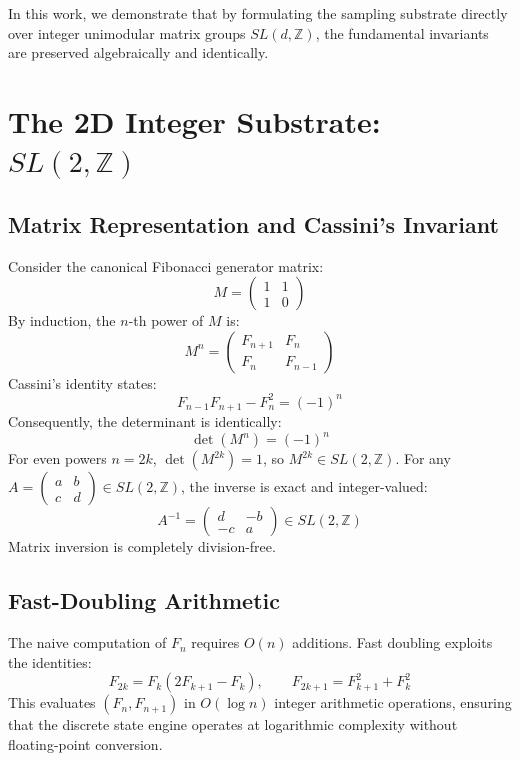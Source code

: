 \documentclass{article}
\theoremstyle{remark}
\begin{document}
In this work, we demonstrate that by formulating the sampling substrate directly over integer unimodular matrix groups $SL(d,\mathbb{Z})$, the fundamental invariants are preserved algebraically and identically.

\section{The 2D Integer Substrate: $SL(2,\mathbb{Z})$}

\subsection{Matrix Representation and Cassini's Invariant}

Consider the canonical Fibonacci generator matrix:
\[
M = \begin{pmatrix} 1 & 1 \\ 1 & 0 \end{pmatrix}
\]
By induction, the $n$-th power of $M$ is:
\[
M^n = \begin{pmatrix} F_{n+1} & F_n \\ F_n & F_{n-1} \end{pmatrix}
\]
Cassini's identity states:
\[
F_{n-1}F_{n+1} - F_n^2 = (-1)^n
\]
Consequently, the determinant is identically:
\[
\det(M^n) = (-1)^n
\]
For even powers $n = 2k$, $\det(M^{2k}) = 1$, so $M^{2k} \in SL(2,\mathbb{Z})$. For any $A = \begin{pmatrix} a & b \\ c & d \end{pmatrix} \in SL(2,\mathbb{Z})$, the inverse is exact and integer-valued:
\[
A^{-1} = \begin{pmatrix} d & -b \\ -c & a \end{pmatrix} \in SL(2,\mathbb{Z})
\]
Matrix inversion is completely division-free.

\subsection{Fast-Doubling Arithmetic}

The naive computation of $F_n$ requires $O(n)$ additions. Fast doubling exploits the identities:
\[
F_{2k} = F_k(2F_{k+1} - F_k), \qquad F_{2k+1} = F_{k+1}^2 + F_k^2
\]
This evaluates $(F_n, F_{n+1})$ in $O(\log n)$ integer arithmetic operations, ensuring that the discrete state engine operates at logarithmic complexity without floating-point conversion.
\end{document}
